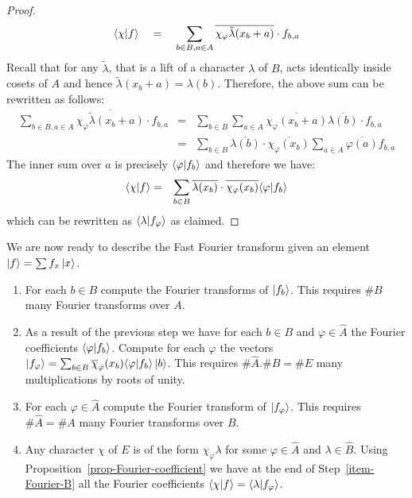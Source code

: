 \documentclass[11pt]{article}
\begin{document}
\begin{proof}
$$
\langle \chi|f \rangle \quad=\quad \sum_{b\in B , a\in A} \overline{\chi_\varphi
  \tilde\lambda(x_b + a)} \cdot f_{b,a}
$$
\noindent
Recall that for any $\tilde\lambda$, that is a lift of a character $\lambda$ of
$B$, acts identically inside cosets of $A$ and hence $\tilde\lambda(x_b + a) = \lambda(b)$. Therefore, the above sum can be
rewritten as follows:
\begin{eqnarray*}
\sum_{b\in B , a\in A} \overline{\chi_\varphi
  \tilde\lambda(x_b + a)} \cdot f_{b,a} & = & \sum_{b\in B} \sum_{a\in A}
\overline{\chi_\varphi(x_b + a)}\overline{\lambda(b)} \cdot
f_{b,a}\\
 & = & \sum_{b\in B} \overline{\lambda(b)}\cdot
\overline{\chi_\varphi(x_b)}\sum_{a\in A}
\overline{\varphi(a)} f_{b,a}
\end{eqnarray*}
The inner sum over $a$ is precisely $\langle \varphi|f_b \rangle$ and
therefore we have:
\begin{eqnarray*}
\langle \chi|f \rangle & = & \sum_{b\in B}
\overline{\lambda(x_b)}\cdot \overline{\chi_\varphi(x_b)}
\langle \varphi|f_b \rangle
\end{eqnarray*}
which can be rewritten as $\langle \lambda|f_\varphi \rangle$ as claimed.
\end{proof}


We are now ready to describe the Fast Fourier transform given an
element $\left| f \right\rangle = \sum f_x \left| x \right\rangle$.

\begin{enumerate}
\item \label{step_inner_dft} For each $b \in B$ compute the Fourier
  transforms of $\left| f_b \right\rangle$. This requires $\# B$ many Fourier
  transforms over $A$.
\item \label{step_bad_mult}As a result of the previous step we have
  for each $b \in B$ and $\varphi \in \hat{A}$ the Fourier
  coefficients $\langle \varphi|f_b \rangle$. Compute for each $\varphi$ the
  vectors $\left| f_\varphi \right\rangle = \sum_{b \in B}
  \overline{\chi}_{\varphi}(x_b) \langle \varphi|f_b \rangle \left| b \right\rangle$. This
  requires $\# \hat{A} . \# B = \# E$ many multiplications by roots of
  unity.
\item \label{step_outer_dft} For each $\varphi \in \hat{A}$ compute
  the Fourier transform of $\left| f_\varphi \right\rangle$. This requires $\#\hat{A}
  = \# A$ many Fourier transforms over $B$.\label{item-Fourier-B}
\item Any character $\chi$ of $E$ is of the
  form $\chi_\varphi \lambda$ for some $\varphi \in \hat{A}$ and
  $\lambda \in \hat{B}$. Using
  Proposition~\ref{prop-Fourier-coefficient} we have at the end of
  Step~\ref{item-Fourier-B} all the Fourier coefficients
  $\langle \chi|f \rangle = \langle \lambda|f_\varphi \rangle$.
\end{enumerate}
\end{document}

